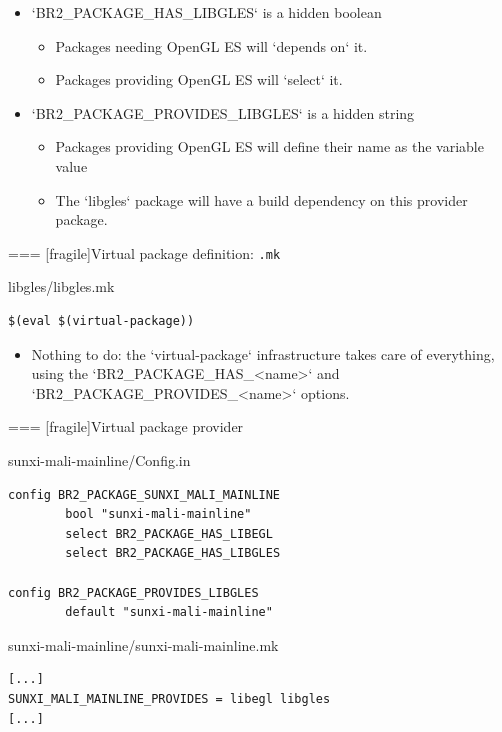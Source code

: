 \begin{itemize}
\item `BR2_PACKAGE_HAS_LIBGLES` is a hidden boolean
  \begin{itemize}
  \item Packages needing OpenGL ES will `depends on` it.
  \item Packages providing OpenGL ES will `select` it.
  \end{itemize}
\item `BR2_PACKAGE_PROVIDES_LIBGLES` is a hidden string
  \begin{itemize}
  \item Packages providing OpenGL ES will define their name as the
    variable value
  \item The `libgles` package will have a build dependency on
    this provider package.
  \end{itemize}
\end{itemize}



=== [fragile]{Virtual package definition: {\tt .mk}}

\begin{block}{libgles/libgles.mk}
\begin{verbatim}
$(eval $(virtual-package))
\end{verbatim}
\end{block}

\begin{itemize}

\item Nothing to do: the `virtual-package` infrastructure takes
  care of everything, using the `BR2_PACKAGE_HAS_<name>` and
  `BR2_PACKAGE_PROVIDES_<name>` options.

\end{itemize}



=== [fragile]{Virtual package provider}

\begin{block}{sunxi-mali-mainline/Config.in}
{\small
\begin{verbatim}
config BR2_PACKAGE_SUNXI_MALI_MAINLINE
        bool "sunxi-mali-mainline"
        select BR2_PACKAGE_HAS_LIBEGL
        select BR2_PACKAGE_HAS_LIBGLES

config BR2_PACKAGE_PROVIDES_LIBGLES
        default "sunxi-mali-mainline"
\end{verbatim}}
\end{block}

\begin{block}{sunxi-mali-mainline/sunxi-mali-mainline.mk}
\begin{verbatim}
[...]
SUNXI_MALI_MAINLINE_PROVIDES = libegl libgles
[...]
\end{verbatim}
\end{block}

